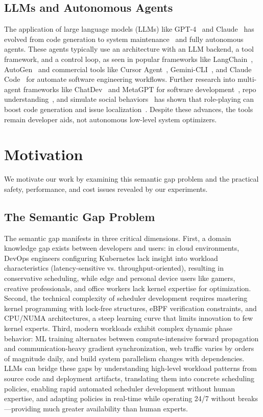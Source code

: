 \documentclass[preprint]{article}
\begin{document}
\subsection{LLMs and Autonomous Agents}

The application of large language models (LLMs) like GPT-4~\cite{openai2023gpt4} and Claude~\cite{anthropic2024claude} has evolved from code generation to system maintenance~\cite{de2025llm} and fully autonomous agents. These agents typically use an architecture with an LLM backend, a tool framework, and a control loop, as seen in popular frameworks like LangChain~\cite{langchain}, AutoGen~\cite{autogen} and commercial tools like Cursor Agent~\cite{cursor}, Gemini-CLI~\cite{geminicli}, and Claude Code~\cite{claudecode} for automate software engineering workflows. Further research into multi-agent frameworks like ChatDev~\cite{qian2024chatdev} and MetaGPT for software development~\cite{hong2023metagpt}, repo understanding~\cite{coderesearcher2025}, and simulate social behaviors~\cite{agent4se2024} has shown that role-playing can boost code generation and issue localization~\cite{Lin2025FlowGen,Batole2025LocalizeAgent}. Despite these advances, the tools remain developer aids, not autonomous low-level system optimizers.
\section{Motivation}
\label{sec:motivation}

We motivate our work by examining this semantic gap problem and the practical safety, performance, and cost issues revealed by our experiments.

\subsection{The Semantic Gap Problem}

The semantic gap manifests in three critical dimensions. First, a domain knowledge gap exists between developers and users: in cloud environments, DevOps engineers configuring Kubernetes lack insight into workload characteristics (latency-sensitive vs. throughput-oriented), resulting in conservative scheduling, while edge and personal device users like gamers, creative professionals, and office workers lack kernel expertise for optimization. Second, the technical complexity of scheduler development requires mastering kernel programming with lock-free structures, eBPF verification constraints, and CPU/NUMA architectures, a steep learning curve that limits innovation to few kernel experts. Third, modern workloads exhibit complex dynamic phase behavior: ML training alternates between compute-intensive forward propagation and communication-heavy gradient synchronization, web traffic varies by orders of magnitude daily, and build system parallelism changes with dependencies. LLMs can bridge these gaps by understanding high-level workload patterns from source code and deployment artifacts, translating them into concrete scheduling policies, enabling rapid automated scheduler development without human expertise, and adapting policies in real-time while operating 24/7 without breaks—providing much greater availability than human experts.
\end{document}
